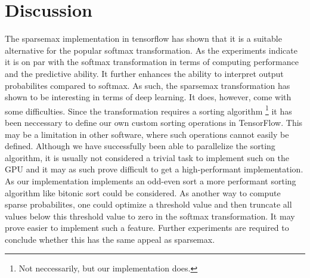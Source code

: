 \section{Discussion}
The sparsemax implementation in tensorflow has shown that it is a suitable alternative for the popular softmax transformation. As the experiments indicate it is on par with the softmax transformation in terms of computing performance and the predictive ability. It further enhances the ability to interpret output probabilites compared to softmax. As such, the sparsemax transformation has shown to be interesting in terms of deep learning. It does, however, come with some difficulties. Since the transformation requires a sorting algorithm \footnote{Not neccessarily, but our implementation does.} it has been neccessary to define our own custom sorting operations in TensorFlow. This  may be a limitation in other software, where such operations cannot easily be defined. Although we have successfully been able to parallelize the sorting algorithm, it is usually not considered a trivial task to implement such on the GPU and it may as such prove difficult to get a high-performant implementation. As our implementation implements an odd-even sort a more performant sorting algorithm like bitonic sort could be considered. As another way to compute sparse probabilites, one could optimize a threshold value and then truncate all values below this threshold value to zero in the softmax transformation. It may prove easier to implement such a feature. Further experiments are required to conclude whether this has the same appeal as sparsemax.